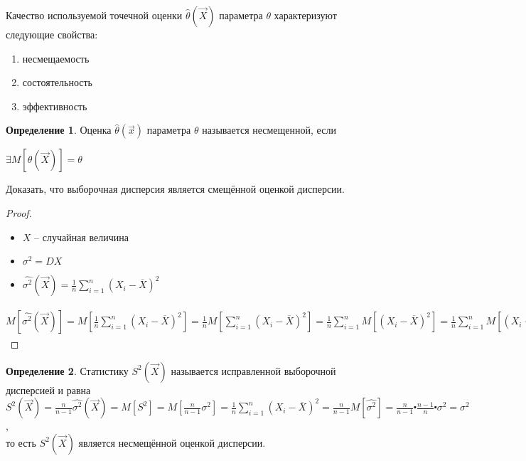 \documentclass[a4paper, 12pt]{article}
\theoremstyle{definition}
\newtheorem{definition}{Определение}[section]
\theoremstyle{leads}
\theoremstyle{example}
\begin{document}
Качество используемой точечной оценки $\hat{\theta}(\vec{X})$ параметра $\theta$ характеризуют следующие свойства:
\begin{enumerate}
	\item несмещаемость
	\item состоятельность 
	\item эффективность
\end{enumerate}

\begin{definition}
	Оценка $\hat{\theta}(\vec{x})$ параметра $\theta$ называется несмещенной, если 
	\begin{center}
		\centering $\exists M[\hat{\theta}(\vec{X})] = \theta$
	\end{center}
\end{definition}

Доказать, что выборочная дисперсия является смещённой оценкой дисперсии.
\begin{proof}
	\begin{itemize}
		\item $X$ -- случайная величина
		\item $\sigma^2 = DX$
		\item $\hat{\sigma^2}(\vec{X}) = \frac{1}{n} \sum_{i=1}^{n} (X_i - \overline{X})^2$
	\end{itemize}
$M[\hat{\sigma^2}(\vec{X})] = M[\frac{1}{n}  \sum_{i=1}^{n} (X_i - \overline{X})^2] = \frac{1}{n} M[ \sum_{i=1}^{n} (X_i - \overline{X})^2] = \frac{1}{n} \sum_{i=1}^{n} M[(X_i - \overline{X})^2] = \frac{1}{n}  \sum_{i=1}^{n} M[(X_i - \frac{1}{n}\sum_{i=1}^{n}X_j)^2] = \frac{1}{n}\sum_{i=1}^{n} M[((X_i - m) - \frac{1}{n} \sum_{j=1}^{n}(X_j - m))^2] = \frac{1}{n} \sum_{i=1}^{n} M [(X_i - m)^2 - \frac{2}{n} \sum_{i=1}^{n}(X_j - m)(X_i - m) + \frac{1}{n^2} (\sum_{j=1}^{n}(X_j - m) )^2] = \frac{1}{n} \sum_{i=1}^{n}\{M [(X_i - m)^2] - \frac{2}{n} \sum_{j=1}^{n} M[(X_i - m)(X_j - m)] + \frac{1}{n^2} \sum_{j=1}^{n} M [(X_j - m)^2 + \frac{1}{n^2} \sum_{j,k=1, k \neq j}^{n}M[(X_k - m)(X_j - m)]] = \frac{1}{n} \sum_{i=1}^{n}\{ \sigma^2 - \frac{2}{n} \sigma^2 + \frac{1}{n^2} \sum_{j=1}^{n} \sigma^2\} = \frac{1}{n} \centerdot n \{ \sigma^2 - \frac{2}{n} \sigma^2 + \frac{1}{n} \sigma^2\} = \sigma^2 - \frac{1}{n} \sigma^2 = \sigma^2 (1 - \frac{1}{n}) = \sigma^2 \frac{n - 1}{n} \neq \sigma^2$
\end{proof}
\begin{definition}
	Статистику $S^2(\vec{X})$ называется исправленной выборочной дисперсией и равна\\
		$S^2(\vec{X}) = \frac{n}{n - 1} \hat{\sigma^2}(\vec{X}) = M[S^2] = M[\frac{n}{n - 1} \sigma^2] = \frac{1}{n} \sum_{i=1}^{n} (X_i - \overline{X})^2 = \frac{n}{n - 1} M[\hat{\sigma^2}] = \frac{n}{n - 1} \centerdot\frac{n - 1}{n} \centerdot\sigma^2 = \sigma^2$, \\
		то есть $S^2(\vec{X})$ является несмещённой оценкой дисперсии.
\end{definition}
\end{document}
